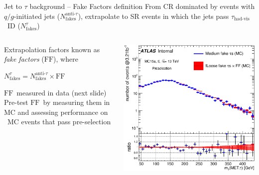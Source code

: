 \documentclass[10pt]{beamer}
\newcommand*{\tauvis}{\ensuremath{\tau_{\text{had-vis}}}}
\newcommand*{\FF}{\ensuremath{\text{FF}}}
\begin{document}
\begin{frame}{Jet to $\tau$ background -- Fake Factors definition}
\centering
From CR dominated by events with $q/g$-initiated jets ($N^{\text{anti-}\tau}_{\text{fakes}}$),
 extrapolate to SR events in which the jets 
pass \tauvis\ ID ($N^\tau_{\text{fakes}}$)

\begin{columns}
	\begin{column}{0.45\linewidth}
\begin{outline}
\1 Extrapolation factors known as {\it fake factors} (\FF), where 
\end{outline}
\begin{tcolorbox}[width=\linewidth, colback=white,colframe=red,nobeforeafter,tcbox raise base,top=0pt,left=0pt,right=0pt,bottom=0pt]
\centering
$N^\tau_{\text{fakes}} = N^{\text{anti-}\tau}_{\text{fakes}}\times\FF$
\end{tcolorbox}
\begin{outline}
\1 \FF\ measured in data (next slide)
\1 Pre-test \FF\ by measuring them in \ttbar MC and assessing 
performance on \ttbar\ MC events that pass pre-selection 
\end{outline}
	\end{column}
	\begin{column}{0.55\linewidth}
   \includegraphics[width=\textwidth]{figures/Fake_MMClosure_MT.eps}
	\end{column}
\end{columns}

\end{frame}
\end{document}
